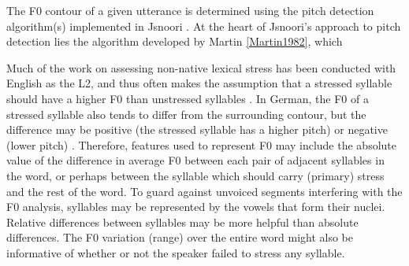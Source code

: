 	The F0 contour of a given utterance is determined using the pitch detection algorithm(s) implemented in Jsnoori . At the heart of Jsnoori's approach to pitch detection lies the algorithm developed by Martin \cref{Martin1982}, which 
	
	Much of the work on assessing non-native lexical stress has been conducted with English as the L2, and thus often makes the assumption that a stressed syllable should have a higher F0 than unstressed syllables \citep{Bonneau2011}. In German, the F0 of a stressed syllable also tends to differ from the surrounding contour, but the difference may be positive (the stressed syllable has a higher pitch) or negative (lower pitch) \citep[p.~267]{Cutler2005}. Therefore, features used to represent F0 may include the absolute value of the difference in average F0 between each pair of adjacent syllables in the word, or perhaps between the syllable which should carry (primary) stress and the rest of the word. To guard against unvoiced segments interfering with the F0 analysis, syllables may be represented by the vowels that form their nuclei. Relative differences between syllables may be more helpful than absolute differences. The F0 variation (range) over the entire word might also be informative of whether or not the speaker failed to stress any syllable.%
	

